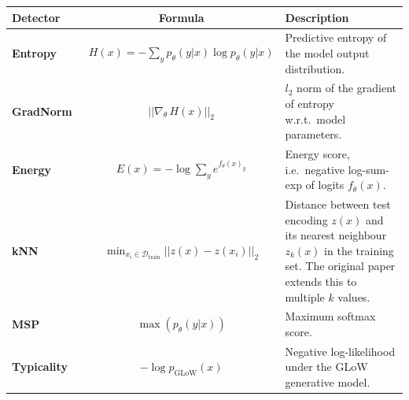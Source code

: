 \begin{tabularx}{\linewidth}{lcX}
    \toprule
    \textbf{Detector} & \textbf{Formula} & \textbf{Description} \\
    \midrule
    \textbf{Entropy}~\cite{dsd_baseline} 
      & $H(x) = - \sum_{y} p_\theta(y|x) \log p_\theta(y|x)$ 
      & Predictive entropy of the model output distribution. \\[0.75em]
         
    \textbf{GradNorm}~\cite{gradients_distshift} 
      & $||\nabla_{\theta}\, H(x)||_{2}$ 
      & $l_2$ norm of the gradient of entropy w.r.t.\ model parameters. \\[0.75em]
         
    \textbf{Energy}~\cite{dsd_energy} 
      & $E(x) = -\log \sum_{y} e^{f_\theta(x)_y}$ 
      & Energy score, i.e.\ negative log-sum-exp of logits $f_\theta(x)$. \\[0.75em]
         
    \textbf{kNN}~\cite{knn_dsd} 
      & $\min_{x_i \in \mathcal{D}_{\text{train}}} ||z(x) - z(x_i)||_2$ 
      & Distance between test encoding $z(x)$ and its nearest neighbour $z_k(x)$ in the training set. The original paper extends this to multiple $k$ values. \\[0.75em]
         
    \textbf{MSP}~\cite{dsd_baseline} 
      & $\max(p_\theta(y|x))$ 
      & Maximum softmax score. \\[0.75em]
         
    \textbf{Typicality}~\cite{typicality_dsd} 
      & $-\log p_{\text{GLoW}}(x)$ 
      & Negative log-likelihood under the GLoW generative model. \\[0.75em]
    \bottomrule
\end{tabularx}
